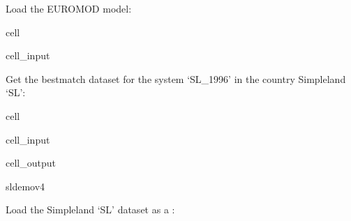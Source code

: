 \documentclass[letterpaper,10pt,english]{sphinxmanual}
\begin{document}
\sphinxAtStartPar
Load the EUROMOD model:

\begin{sphinxuseclass}{cell}
\begin{sphinxuseclass}{cell_input}
\begin{sphinxVerbatim}[commandchars=\\\{\}]
   
  
\end{sphinxVerbatim}

\end{sphinxuseclass}
\end{sphinxuseclass}
\sphinxAtStartPar
Get the best\sphinxhyphen{}match dataset for the system ‘SL\_1996’ in the country Simpleland ‘SL’:

\begin{sphinxuseclass}{cell}
\begin{sphinxuseclass}{cell_input}
\begin{sphinxVerbatim}[commandchars=\\\{\}]
  \PYG{p}{[}\PYG{p}{]}\PYG{p}{[}\PYG{p}{]}\PYG{p}{[}\PYG{p}{]}
\end{sphinxVerbatim}

\end{sphinxuseclass}
\begin{sphinxuseclass}{cell_output}
\begin{sphinxVerbatim}[commandchars=\\\{\}]
\PYGZsq{}sl\PYGZus{}demo\PYGZus{}v4\PYGZsq{}
\end{sphinxVerbatim}

\end{sphinxuseclass}
\end{sphinxuseclass}
\sphinxAtStartPar
Load the Simpleland ‘SL’ dataset as a :
\end{document}
